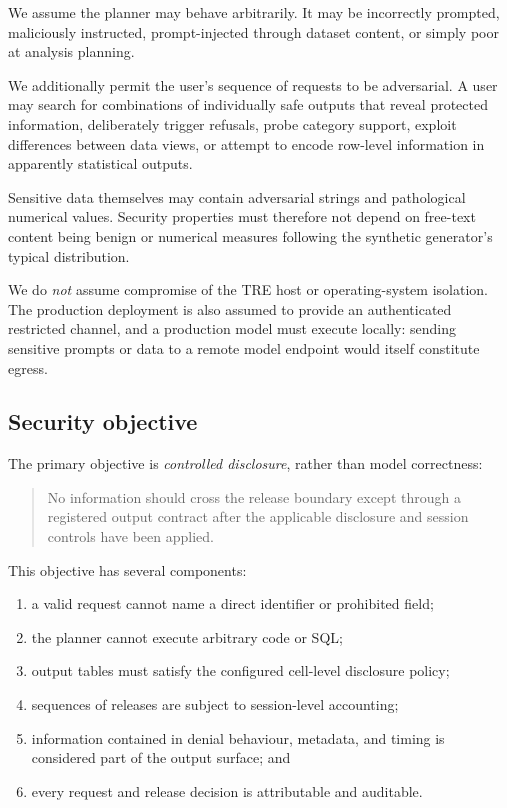 \documentclass[11pt,a4paper]{article}
\begin{document}
We assume the planner may behave arbitrarily. It may be incorrectly prompted,
maliciously instructed, prompt-injected through dataset content, or simply poor
at analysis planning.

We additionally permit the user's sequence of requests to be adversarial. A
user may search for combinations of individually safe outputs that reveal
protected information, deliberately trigger refusals, probe category support,
exploit differences between data views, or attempt to encode row-level
information in apparently statistical outputs.

Sensitive data themselves may contain adversarial strings and pathological
numerical values. Security properties must therefore not depend on free-text
content being benign or numerical measures following the synthetic generator's
typical distribution.

We do \emph{not} assume compromise of the TRE host or operating-system
isolation. The production deployment is also assumed to provide an
authenticated restricted channel, and a production model must execute locally:
sending sensitive prompts or data to a remote model endpoint would itself
constitute egress.

\subsection{Security objective}

The primary objective is \emph{controlled disclosure}, rather than model
correctness:

\begin{quote}
No information should cross the release boundary except through a registered
output contract after the applicable disclosure and session controls have been
applied.
\end{quote}

This objective has several components:

\begin{enumerate}[leftmargin=*]
  \item a valid request cannot name a direct identifier or prohibited field;
  \item the planner cannot execute arbitrary code or SQL;
  \item output tables must satisfy the configured cell-level disclosure policy;
  \item sequences of releases are subject to session-level accounting;
  \item information contained in denial behaviour, metadata, and timing is
  considered part of the output surface; and
  \item every request and release decision is attributable and auditable.
\end{enumerate}
\end{document}
